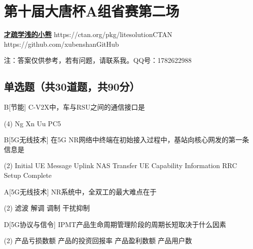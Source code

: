 \chapter{第十届大唐杯A组省赛第二场}
\fancyhead[R]{\color{H6}\kaishu\rightmark\,}

\date{2023年4月16日}{}{\href{https://qm.qq.com/q/UPbGudx8cK}{\textbf{才疏学浅的小熊}}}
{}
{https://ctan.org/pkg/litesolution}{CTAN}
{https://github.com/xubenshan}{GitHub}

注：答案仅供参考，若有问题，请联系我。QQ号：1782622988

\section{单选题（共30道题，共90分）}



\begin{choice}{B}[节能]
	C-V2X中，车与RSU之间的通信接口是
	\begin{tasks}(4)
		\task Ng
		\task Xn
		\task Uu
		\task PC5
	\end{tasks}
\end{choice}


\begin{choice}{B}[5G无线技术]
	在5G NR网络中终端在初始接入过程中，基站向核心网发的第一条信息是
	\begin{tasks}(2)
		\task Initial UE Message
		\task Uplink NAS Transfer
		\task UE Capability Information
		\task RRC Setup Complete
	\end{tasks}
\end{choice}




\begin{choice}{A}[5G无线技术]
	NR系统中，全双工的最大难点在于
	\begin{tasks}(2)
		\task 滤波
		\task 解调
		\task 调制
		\task 干扰抑制
	\end{tasks}
\end{choice}


\begin{choice}{D}[5G协议与信令]
	IPMT产品生命周期管理阶段的周期长短取决于什么因素
	\begin{tasks}(2)
		\task 产品亏损数额
		\task 产品的投资回报率
		\task 产品盈利数额
		\task 产品用户数
	\end{tasks}
\end{choice}


